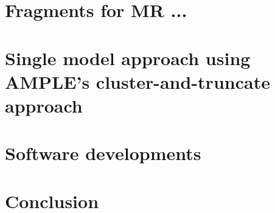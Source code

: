 \documentclass[11pt,oneside,leqno,openright]{report}
\begin{document}
\chapter{Fragments for MR ...}
% 

\chapter{Single model approach using AMPLE's cluster-and-truncate approach}
% 

\chapter{Software developments}
% 

\chapter{Conclusion}
% 
%
% 

\printbibliography[heading=bibintoc]
\end{document}
